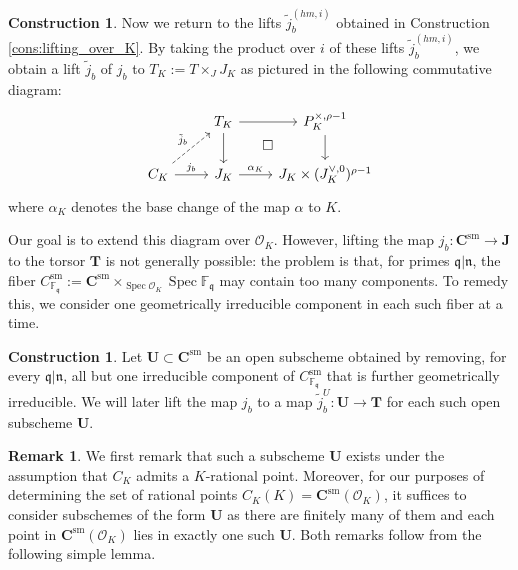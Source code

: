 \documentclass[11pt,oneside]{amsart}
\theoremstyle{plain}
\theoremstyle{definition}
\newtheorem{remark}[theorem]{Remark}
\newtheorem{construction}[theorem]{Construction}
\def\lra{{\longrightarrow}}
\DeclareMathOperator{\sm}{sm}
\DeclareMathOperator{\spec}{Spec} \DeclareMathOperator{\sgn}{sign}
\def\TT{\mathbf{T}}
\def\F{\mathbb{F}}
\def\J{\mathbf{J}}
\def\CC{\mathbf{C}}
\def\U{\mathbf{U}}
\def\oh{\mathcal{O}}
\begin{document}
\begin{construction} Now we return to the lifts $\tilde{j}_b^{(hm, i)}$ obtained in Construction \ref{cons:lifting_over_K}. By taking the product over $i$ of these lifts $\tilde{j}_b^{(hm, i)}$, we obtain a lift $\tilde{j}_b$ of $j_b$ to $T_K:=T\times_J J_K$ as pictured in the following commutative diagram:
\begin{equation}\label{diag:AJliftTK}
\begin{tikzcd}[bend angle = 20]
  & T_K  \arrow{r} \arrow{d} \arrow[phantom]{dr}{\square}
  & P_K^{\times, \rho-1} \arrow{d} \\
  C_K \arrow{r}{j_b} \arrow[dashrightarrow]{ru}{\tilde{j}_{b}}
  & J_K \arrow{r}{\alpha_K}
  & J_K\times (J_K^{\vee, 0})^{\rho-1}
\end{tikzcd}
\end{equation}
where $\alpha_K$ denotes the base change of the map $\alpha$  to $K$.
\end{construction}


Our goal is to extend this diagram over $\oh_K$. However, lifting the map $j_b : \CC^{\sm}\lra \J$ to the torsor $\TT$ is not generally possible: the problem is that, for primes $\mathfrak{q}\vert \mathfrak{n}$, the fiber $C^{\sm}_{\F_\mathfrak{q}} := \CC^{\sm} \times_{\spec \oh_K} \spec {\F_{\mathfrak{q}}}$ may contain too many components. To remedy this, we consider one geometrically irreducible component in each such fiber at a time.  

\begin{construction} \label{cons:U}
Let $\U \subset \CC^{\sm}$ be an open subscheme obtained by removing, for every $\mathfrak{q} \vert \mathfrak{n}$, all but one irreducible component of $C^{\sm}_{\F_\mathfrak{q}}$ that is further geometrically irreducible. We will later lift the map $j_b$ to a map $\tilde j_b^U: \U \lra \TT$ for each such open subscheme $\U$.   
\end{construction}

\begin{remark}\label{remark:U} We first remark that  such a subscheme $\U$ exists under the assumption that $C_K$ admits a $K$-rational point. Moreover, for our purposes of determining the set of rational points $C_K (K) = \CC^{\sm} (\oh_K)$, it suffices to consider subschemes of the form $\U$ as there are finitely many of them and each point in $\CC^{\sm}(\oh_K)$ lies in exactly one such $\U$. Both remarks follow from the following simple lemma. 
\end{remark}
\end{document}
